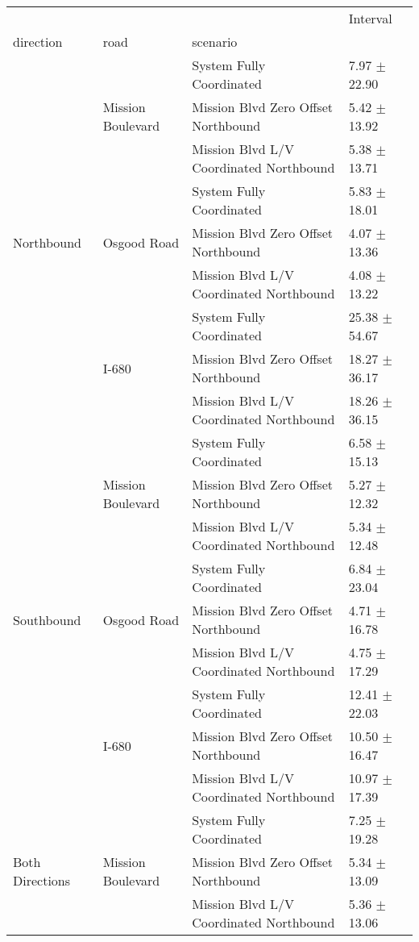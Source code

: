 \begin{tabular}{llll}
\toprule
 &  &  & Interval \\
direction & road & scenario &  \\
\midrule
\multirow[t]{9}{*}{Northbound} & \multirow[t]{3}{*}{Mission Boulevard} & System Fully Coordinated & 7.97 $\pm$ 22.90 \\
 &  & Mission Blvd Zero Offset Northbound & 5.42 $\pm$ 13.92 \\
 &  & Mission Blvd L/V Coordinated Northbound & 5.38 $\pm$ 13.71 \\
 & \multirow[t]{3}{*}{Osgood Road} & System Fully Coordinated & 5.83 $\pm$ 18.01 \\
 &  & Mission Blvd Zero Offset Northbound & 4.07 $\pm$ 13.36 \\
 &  & Mission Blvd L/V Coordinated Northbound & 4.08 $\pm$ 13.22 \\
 & \multirow[t]{3}{*}{I-680} & System Fully Coordinated & 25.38 $\pm$ 54.67 \\
 &  & Mission Blvd Zero Offset Northbound & 18.27 $\pm$ 36.17 \\
 &  & Mission Blvd L/V Coordinated Northbound & 18.26 $\pm$ 36.15 \\
\multirow[t]{9}{*}{Southbound} & \multirow[t]{3}{*}{Mission Boulevard} & System Fully Coordinated & 6.58 $\pm$ 15.13 \\
 &  & Mission Blvd Zero Offset Northbound & 5.27 $\pm$ 12.32 \\
 &  & Mission Blvd L/V Coordinated Northbound & 5.34 $\pm$ 12.48 \\
 & \multirow[t]{3}{*}{Osgood Road} & System Fully Coordinated & 6.84 $\pm$ 23.04 \\
 &  & Mission Blvd Zero Offset Northbound & 4.71 $\pm$ 16.78 \\
 &  & Mission Blvd L/V Coordinated Northbound & 4.75 $\pm$ 17.29 \\
 & \multirow[t]{3}{*}{I-680} & System Fully Coordinated & 12.41 $\pm$ 22.03 \\
 &  & Mission Blvd Zero Offset Northbound & 10.50 $\pm$ 16.47 \\
 &  & Mission Blvd L/V Coordinated Northbound & 10.97 $\pm$ 17.39 \\
\multirow[t]{9}{*}{Both Directions} & \multirow[t]{3}{*}{Mission Boulevard} & System Fully Coordinated & 7.25 $\pm$ 19.28 \\
 &  & Mission Blvd Zero Offset Northbound & 5.34 $\pm$ 13.09 \\
 &  & Mission Blvd L/V Coordinated Northbound & 5.36 $\pm$ 13.06 \\

\end{tabular}
